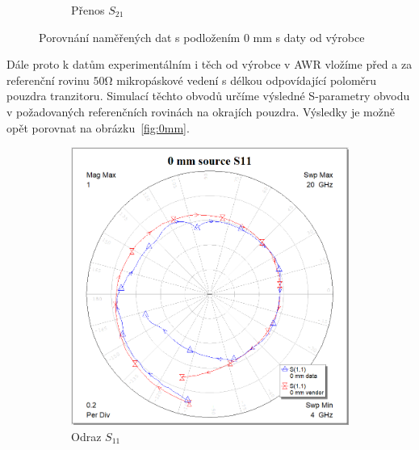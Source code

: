 \documentclass[11pt,a4paper]{article}
\newcommand{\Ohm}{\mathrm{\Omega}}
\begin{document}
\begin{figure}[!ht]
\begin{subfigure}{0.45\textwidth}
    \caption{Přenos $S_{21}$}
\end{subfigure}
\caption{\label{fig:0mm-center}Porovnání naměřených dat s podložením 0 mm s daty od výrobce}
\end{figure}

Dále proto k datům experimentálním i těch od výrobce v AWR vložíme před a za referenční rovinu $50\Ohm$ mikropáskové vedení s délkou odpovídající poloměru pouzdra tranzitoru. Simulací těchto obvodů určíme výsledné S-parametry obvodu v požadovaných referenčních rovinách na okrajích pouzdra. Výsledky je možně opět porovnat na obrázku~\ref{fig:0mm}.
\begin{figure}[!ht]
    \centering
\begin{subfigure}{0.45\textwidth}
    \centering
    \includegraphics[width=\textwidth]{src/0mm-S11.png}
    \caption{Odraz $S_{11}$}
\end{subfigure}
\begin{subfigure}{0.45\textwidth}
    \centering

\end{subfigure}
\end{figure}
\end{document}
